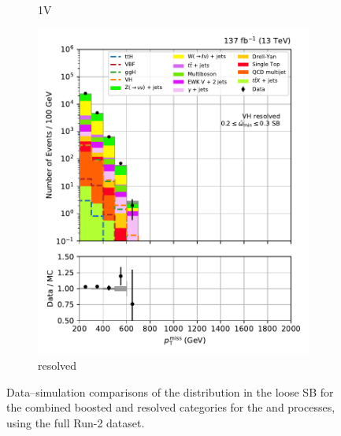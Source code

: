 \begin{figure}[htbp]
\begin{subfigure}[b]{0.24\textwidth}
        \caption{\VH 1V}
    \end{subfigure}
    \hfill
    \begin{subfigure}[b]{0.24\textwidth}
        \includegraphics[width=\textwidth]{figures/region_plots/full_Run2/sideband_4/VH_resolved.pdf}
        \caption{\VH resolved}
    \end{subfigure}
    \caption[Data--simulation comparisons of the \ptmiss distribution in the loose \omegaTilde sideband for the combined boosted and resolved categories for the \ttH and \VH processes, using the full Run-2 dataset]{Data--simulation comparisons of the \ptmiss distribution in the loose \omegaTilde \gls{SB} for the combined boosted and resolved categories for the \ttH and \VH processes, using the full Run-2 dataset.}
    \label{fig:htoinv_sb_yields_comb2016to18_loose_minOmegaTilde}
\end{figure}

